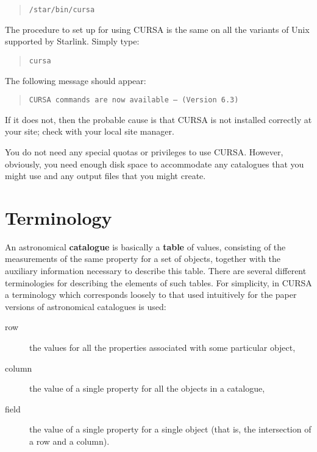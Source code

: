 \documentclass[twoside,11pt]{article}
\newcommand{\xlabel}[1]{}
\renewcommand{\_}{\texttt{\symbol{95}}}
\begin{document}
\begin{verse}
{\tt /star/bin/cursa}
\end{verse}

The procedure to set up for using CURSA is the same on all the variants
of Unix supported by Starlink. Simply type:

\begin{verse}
{\tt cursa}
\end{verse}

The following message should appear:

\begin{verse}
{\tt CURSA commands are now available -- (Version 6.3)} \\
\end{verse}

If it does not, then the probable cause is that CURSA is not installed
correctly at your site; check with your local site manager.

You do not need any special quotas or privileges to use CURSA. However,
obviously, you need enough disk space to accommodate any catalogues
that you might use and any output files that you might create.


\section{\xlabel{COMP}\label{COMP}Terminology}

An astronomical {\bf catalogue} is basically a {\bf table} of values,
consisting of the measurements of the same property for a set of
objects, together with the auxiliary information necessary to describe
this table. There are several different terminologies for describing
the elements of such tables. For simplicity, in CURSA a terminology which
corresponds loosely to that used intuitively for the paper versions of
astronomical catalogues is used:

\begin{description}

  \item[row] the values for all the properties associated with some
   particular object,

  \item[column] the value of a single property for all the objects in
   a catalogue,

  \item[field] the value of a single property for a single object
   (that is, the intersection of a row and a column).

\end{description}
\end{document}
